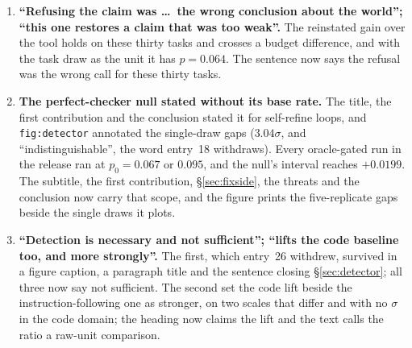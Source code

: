 \documentclass[11pt]{article}
\begin{document}
\begin{enumerate}
{    two results are one mechanism read from its two ends''.} Stated in the abstract, introduction,
    \S\ref{sec:fixside}, conclusion and entries~36 and~42. That paper reports a single cell at
    $p_0 = 0.267$ (three seeds) and does not establish that the gain depends on $p_0$, and no
    run in either paper crosses a perfect gate with a higher $p_0$. Every site now says what the
    companion reports, and the shared mechanism is stated as an expectation this release does not
    test.
  \item \textbf{``Refusing the claim was \ldots\ the wrong conclusion about the world''; ``this one
    restores a claim that was too weak''.} The reinstated gain over the tool holds on these
    thirty tasks and crosses a budget difference, and with the task draw as the unit it has
    $p = 0.064$. The sentence now says the refusal was the wrong call for these thirty tasks.
  \item \textbf{The perfect-checker null stated without its base rate.} The title, the first
    contribution and the conclusion stated it for self-refine loops, and \texttt{fig:detector}
    annotated the single-draw gaps ($3.04\sigma$, and ``indistinguishable'', the word entry~18
    withdraws). Every oracle-gated run in the release ran at $p_0 = 0.067$ or $0.095$, and the
    null's interval reaches $+0.0199$. The subtitle, the first contribution, \S\ref{sec:fixside},
    the threats and the conclusion now carry that scope, and the figure prints the five-replicate
    gaps beside the single draws it plots.
  \item \textbf{``Detection is necessary and not sufficient''; ``lifts the code baseline too, and
    more strongly''.} The first, which entry~26 withdrew, survived in a figure caption, a
    paragraph title and the sentence closing \S\ref{sec:detector}; all three now say not
    sufficient. The second set the code lift beside the instruction-following one as stronger, on
    two scales that differ and with no $\sigma$ in the code domain; the heading now claims the lift
    and the text calls the ratio a raw-unit comparison.
\end{enumerate}
\end{document}
